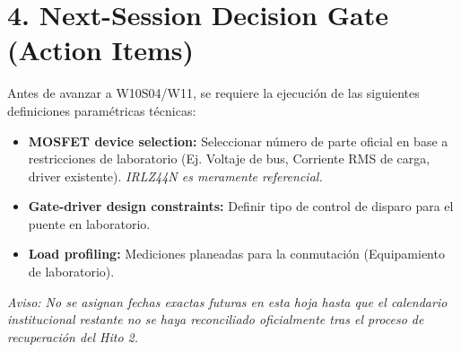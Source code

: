 \documentclass[11pt, a4paper]{article}
\begin{document}
\section*{4. Next-Session Decision Gate (Action Items)}
Antes de avanzar a W10S04/W11, se requiere la ejecución de las siguientes definiciones paramétricas técnicas:
\begin{itemize}
    \item[$\square$] \textbf{MOSFET device selection:} Seleccionar número de parte oficial en base a restricciones de laboratorio (Ej. Voltaje de bus, Corriente RMS de carga, driver existente). \textit{IRLZ44N es meramente referencial.}
    \item[$\square$] \textbf{Gate-driver design constraints:} Definir tipo de control de disparo para el puente en laboratorio.
    \item[$\square$] \textbf{Load profiling:} Mediciones planeadas para la conmutación (Equipamiento de laboratorio).
\end{itemize}
\textit{Aviso: No se asignan fechas exactas futuras en esta hoja hasta que el calendario institucional restante no se haya reconciliado oficialmente tras el proceso de recuperación del Hito 2.}
\end{document}
